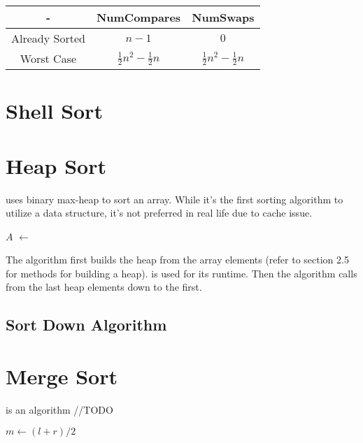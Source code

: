 \documentclass{report}
\begin{document}
\begin{center}
  \begin{tabular}{ | c | c | c | }
    \hline
    - & NumCompares & NumSwaps \\
    \hline
    Already Sorted & $n - 1$ & $0$ \\
    \hline
    Worst Case &  $\frac{1}{2} n^2 - \frac{1}{2} n$ & $\frac{1}{2} n^2 - \frac{1}{2} n$ \\
    \hline
  \end{tabular}
\end{center}

\section{Shell Sort}

\section{Heap Sort}

 uses binary max-heap to sort an array. While it's the first sorting algorithm to utilize a data structure, it's not preferred in real life due to cache issue.

\noindent \hrulefill
\begin{algorithmic}[1]
   
    \State $A$ $\gets$ 
      \State {}
    \EndFor
    \State {}
  \EndFunction
\end{algorithmic}
\noindent \hrulefill

The algorithm first builds the heap from the array elements (refer to section 2.5 for methods for building a heap).  is used for its runtime. Then the algorithm calls  from the last heap elements down to the first.

\subsection{Sort Down Algorithm}

\section{Merge Sort}

 is an algorithm //TODO

\noindent \hrulefill
\begin{algorithmic}[1]
   
    \State $m \gets (l + r) / 2$
    \State {}
    \State {}
    \State {}
    \EndIf
  \State {}
  \EndFunction
\end{algorithmic}
\noindent \hrulefill
\end{document}
